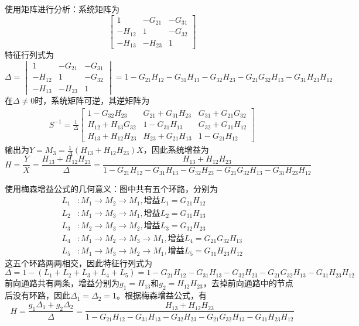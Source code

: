\begin{example}[单入单出信号流图]
\begin{figure}[H]
    \end{figure}
    使用矩阵进行分析：系统矩阵为
    \[\begin{bmatrix}
        1 & -G_{21} & -G_{31} \\
        -H_{12} & 1 & -G_{32} \\
        -H_{13} & -H_{23} & 1
    \end{bmatrix}\]
    特征行列式为
    $$\Delta=\begin{vmatrix}
        1 & -G_{21} & -G_{31} \\
        -H_{12} & 1 & -G_{32} \\
        -H_{13} & -H_{23} & 1
    \end{vmatrix}=1-G_{21}H_{12}-G_{31}H_{13}-G_{32}H_{23}-G_{21}G_{32}H_{13}-G_{31}H_{23}H_{12}$$
    在$\Delta\neq 0$时，系统矩阵可逆，其逆矩阵为\begin{align*}
        S^{-1}=\frac{1}{\Delta}\begin{bmatrix}
            1-G_{32}H_{23} & G_{21}+G_{31}H_{23} & G_{31}+G_{21}G_{32} \\
            H_{12}+H_{13}G_{32} & 1-G_{31}H_{13} & G_{32}+G_{31}H_{12} \\
            H_{13}+H_{12}H_{23} & H_{23}+G_{21}H_{13} & 1-G_{21}H_{12}
        \end{bmatrix}
    \end{align*}
    输出为$Y=M_3=\frac{1}{\Delta}(H_{13}+H_{12}H_{23})X$，因此系统增益为
    \[H=\frac{Y}{X}=\frac{H_{13}+H_{12}H_{23}}{\Delta}=\frac{H_{13}+H_{12}H_{23}}{1-G_{21}H_{12}-G_{31}H_{13}-G_{32}H_{23}-G_{21}G_{32}H_{13}-G_{31}H_{23}H_{12}}\]

    使用梅森增益公式的几何意义：图中共有五个环路，分别为\begin{align*}
        L_1&:M_1\to M_2\to M_1,\text{增益}L_1=G_{21}H_{12}\\
        L_2&:M_1\to M_3\to M_1,\text{增益}L_2=G_{31}H_{13}\\
        L_3&:M_2\to M_3\to M_2,\text{增益}L_3=G_{32}H_{23}\\
        L_4&:M_1\to M_2\to M_3\to M_1,\text{增益}L_4=G_{21}G_{32}H_{13}\\
        L_5&:M_1\to M_3\to M_2\to M_1,\text{增益}L_5=G_{31}H_{23}H_{12}
    \end{align*}
    这五个环路两两相交，因此特征行列式为
    \[\Delta=1-(L_1+L_2+L_3+L_4+L_5)=1-G_{21}H_{12}-G_{31}H_{13}-G_{32}H_{23}-G_{21}G_{32}H_{13}-G_{31}H_{23}H_{12}\]
    前向通路共有两条，增益分别为$g_1=H_{13}$和$g_2=H_{12}H_{23}$，去掉前向通路中的节点后没有环路，因此$\Delta_1=\Delta_2=1$。根据梅森增益公式，有
    \[H=\frac{g_1\Delta_1+g_2\Delta_2}{\Delta}=\frac{H_{13}+H_{12}H_{23}}{1-G_{21}H_{12}-G_{31}H_{13}-G_{32}H_{23}-G_{21}G_{32}H_{13}-G_{31}H_{23}H_{12}}\]
\end{example}

